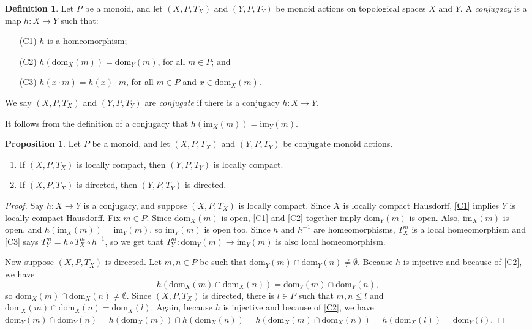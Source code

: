 \documentclass[11pt]{amsart}
\makeatletter
\theoremstyle{definition}
\numberwithin{thm}{section}
\numberwithin{equation}{section}
\newtheorem{definition}[thm]{Definition}
\newtheorem{proposition}[thm]{Proposition}
\def\namedlabel#1#2{\begingroup
    #2%
    \def\@currentlabel{#2}%
    \phantomsection\label{#1}\endgroup
}
\newcommand{\Define}[1]{\emph{#1}}
\newcommand{\RPA}[2]{#1 \cdot #2}
\newcommand{\RPAdom}[2]{\textrm{dom}_{#1}(#2)}
\newcommand{\RPAcod}[2]{\textrm{im}_{#1}(#2)}
\newcommand{\RPAmap}[2]{{T_{#1}^{#2}}}
\makeatother
\begin{document}
\begin{definition}
\label{def:conjugate}
Let $P$ be a monoid, and let $(X, P, T_X)$ and $(Y, P, T_Y)$ be monoid actions on topological spaces $X$ and $Y$.
A \Define{conjugacy} is a map $h \colon X \to Y$ such that:
\begin{itemize}
\item[\namedlabel{C1}{(C1)}] $h$ is a homeomorphism;
\item[\namedlabel{C2}{(C2)}] $h(\RPAdom{X}{m}) = \RPAdom{Y}{m}$, for all $m \in P$; and 
\item[\namedlabel{C3}{(C3)}] $h(\RPA{x}{m}) = \RPA{h(x)}{m}$, for all $m \in P$ and $x \in \RPAdom{X}{m}$.
\end{itemize}
We say $(X, P, T_X)$ and $(Y, P, T_Y)$ are \Define{conjugate} if there is a conjugacy $h \colon X \to Y$.
\end{definition}

It follows from the definition of a conjugacy that $h(\RPAcod{X}{m}) = \RPAcod{Y}{m}$.

\begin{proposition}
\label{prop:conjugacy_preserves_properties}
Let $P$ be a monoid, and let $(X, P, T_X)$ and $(Y, P, T_Y)$ be conjugate monoid actions. 
\begin{enumerate}
\item If $(X, P, T_X)$ is locally compact, then $(Y, P, T_Y)$ is locally compact. 
\item If $(X, P, T_X)$ is directed, then $(Y, P, T_Y)$ is directed.
\end{enumerate}
\end{proposition}
\begin{proof}
Say $h \colon X \to Y$ is a conjugacy, and suppose $(X, P, T_X)$ is locally compact.
Since $X$ is locally compact Hausdorff, \ref{C1} implies $Y$ is locally compact Hausdorff.
Fix $m \in P$.
Since $\RPAdom{X}{m}$ is open, \ref{C1} and \ref{C2} together imply $\RPAdom{Y}{m}$ is open.
Also, $\RPAcod{X}{m}$ is open, and $h(\RPAcod{X}{m}) = \RPAcod{Y}{m}$, so $\RPAcod{Y}{m}$ is open too.
Since $h$ and $h^{-1}$ are homeomorphisms, $T^m_X$ is a local homeomorphism and \ref{C3} says $T_Y^m=h \circ T_X^m \circ h^{-1}$, so we get that $\RPAmap{Y}{m} \colon \RPAdom{Y}{m} \to \RPAcod{Y}{m}$ is also local homeomorphism.

Now suppose $(X, P, T_X)$ is directed.
Let $m, n \in P$ be such that $\RPAdom{Y}{m} \cap \RPAdom{Y}{n} \neq \emptyset$.
Because $h$ is injective and because of \ref{C2}, we have
\[
h(\RPAdom{X}{m} \cap \RPAdom{X}{n})
= \RPAdom{Y}{m} \cap \RPAdom{Y}{n},
\]
so $\RPAdom{X}{m} \cap \RPAdom{X}{n} \neq \emptyset$.
Since $(X, P, T_X)$ is directed, there is $l \in P$ such that $m, n \leq l$ and $\RPAdom{X}{m} \cap \RPAdom{X}{n} = \RPAdom{X}{l}$.
Again, because $h$ is injective and because of \ref{C2}, we have
\(
\RPAdom{Y}{m} \cap \RPAdom{Y}{n}
= h(\RPAdom{X}{m}) \cap h(\RPAdom{X}{n})
= h(\RPAdom{X}{m} \cap \RPAdom{X}{n}) 
= h(\RPAdom{X}{l}) 
= \RPAdom{Y}{l}.
\)
\end{proof}
\end{document}
